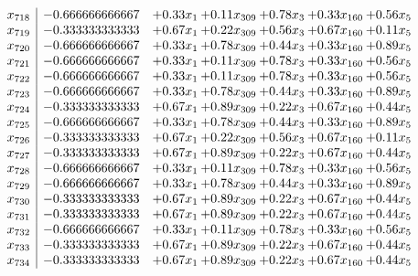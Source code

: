 \documentclass[8pt]{article}
\begin{document}
\[\begin{array}{c| c c@{\hskip 2pt} c@{\hskip 2pt} c@{\hskip 2pt} c@{\hskip 2pt} c@{\hskip 2pt} }
 x_{718}   &  -0.666666666667 & +  0.33 x_{1} & +  0.11 x_{309} & +  0.78 x_{3} & +  0.33 x_{160} & +  0.56 x_{5}\\
 x_{719}   &  -0.333333333333 & +  0.67 x_{1} & +  0.22 x_{309} & +  0.56 x_{3} & +  0.67 x_{160} & +  0.11 x_{5}\\
 x_{720}   &  -0.666666666667 & +  0.33 x_{1} & +  0.78 x_{309} & +  0.44 x_{3} & +  0.33 x_{160} & +  0.89 x_{5}\\
 x_{721}   &  -0.666666666667 & +  0.33 x_{1} & +  0.11 x_{309} & +  0.78 x_{3} & +  0.33 x_{160} & +  0.56 x_{5}\\
 x_{722}   &  -0.666666666667 & +  0.33 x_{1} & +  0.11 x_{309} & +  0.78 x_{3} & +  0.33 x_{160} & +  0.56 x_{5}\\
 x_{723}   &  -0.666666666667 & +  0.33 x_{1} & +  0.78 x_{309} & +  0.44 x_{3} & +  0.33 x_{160} & +  0.89 x_{5}\\
 x_{724}   &  -0.333333333333 & +  0.67 x_{1} & +  0.89 x_{309} & +  0.22 x_{3} & +  0.67 x_{160} & +  0.44 x_{5}\\
 x_{725}   &  -0.666666666667 & +  0.33 x_{1} & +  0.78 x_{309} & +  0.44 x_{3} & +  0.33 x_{160} & +  0.89 x_{5}\\
 x_{726}   &  -0.333333333333 & +  0.67 x_{1} & +  0.22 x_{309} & +  0.56 x_{3} & +  0.67 x_{160} & +  0.11 x_{5}\\
 x_{727}   &  -0.333333333333 & +  0.67 x_{1} & +  0.89 x_{309} & +  0.22 x_{3} & +  0.67 x_{160} & +  0.44 x_{5}\\
 x_{728}   &  -0.666666666667 & +  0.33 x_{1} & +  0.11 x_{309} & +  0.78 x_{3} & +  0.33 x_{160} & +  0.56 x_{5}\\
 x_{729}   &  -0.666666666667 & +  0.33 x_{1} & +  0.78 x_{309} & +  0.44 x_{3} & +  0.33 x_{160} & +  0.89 x_{5}\\
 x_{730}   &  -0.333333333333 & +  0.67 x_{1} & +  0.89 x_{309} & +  0.22 x_{3} & +  0.67 x_{160} & +  0.44 x_{5}\\
 x_{731}   &  -0.333333333333 & +  0.67 x_{1} & +  0.89 x_{309} & +  0.22 x_{3} & +  0.67 x_{160} & +  0.44 x_{5}\\
 x_{732}   &  -0.666666666667 & +  0.33 x_{1} & +  0.11 x_{309} & +  0.78 x_{3} & +  0.33 x_{160} & +  0.56 x_{5}\\
 x_{733}   &  -0.333333333333 & +  0.67 x_{1} & +  0.89 x_{309} & +  0.22 x_{3} & +  0.67 x_{160} & +  0.44 x_{5}\\
 x_{734}   &  -0.333333333333 & +  0.67 x_{1} & +  0.89 x_{309} & +  0.22 x_{3} & +  0.67 x_{160} & +  0.44 x_{5}\\

\end{array}\]
\end{document}
